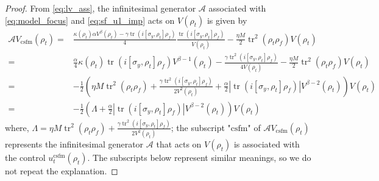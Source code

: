 \documentclass[]{elsarticle}
\begin{document}
\begin{proof}
	From \eqref{eq:lv_ass}, the infinitesimal generator $\mathcal{A}$ associated with \eqref{eq:model_focus} and \eqref{eq:sf_u1_imp} acts on $V\left(\rho_{t}\right)$ is given by
	\begin{equation}\label{eq:LV_sf_imp}
		\begin{aligned}
			\mathcal{A}V_{\mathrm{csfm}}\left(\rho_{t}\right)=&\frac{\kappa\left(\rho_{t}\right)\alpha V^{\beta}\left(\rho_{t}\right)-\gamma \operatorname{tr}\left(i\left[\sigma_{y}, \rho_{t}\right] \rho_f\right)}{4} \frac{\operatorname{tr}\left(i\left[\sigma_{y}, \rho_{t}\right] {\rho_f}\right)}{V\left(\rho_{t}\right)}-\frac{\eta M}{2}\operatorname{tr}^2\left(\rho_{t} {\rho_f}\right) V\left(\rho_{t}\right)\\
			=&\frac{\alpha}{4}\kappa\left(\rho_{t}\right)\operatorname{tr}\left(i\left[\sigma_{y}, \rho_{t}\right] {\rho_f}\right)V^{\beta-1}\left(\rho_{t}\right)
			-\frac{\gamma\operatorname{tr}^2\left(i\left[\sigma_{y}, \rho_{t}\right] {\rho_f}\right)}{4V\left(\rho_{t}\right)}
			-\frac{\eta M}{2}\operatorname{tr}^{2}\left(\rho_{t} {\rho_f}\right) V\left(\rho_{t}\right)\\
			=&-\frac{1}{2}\left({\eta M}\operatorname{tr}^{2}\left(\rho_{t} {\rho_f}\right)+\frac{\gamma\operatorname{tr}^2\left(i\left[\sigma_{y}, \rho_{t}\right] {\rho_f}\right)}{2V^2\left(\rho_{t}\right)}+\frac{\alpha}{2}|\operatorname{tr}\left(i\left[\sigma_{y}, \rho_{t}\right] {\rho_f}\right)| V^{\beta-2}\left(\rho_{t}\right)\right)V\left(\rho_{t}\right)\\
			=&-\frac{1}{2}\left(\Lambda+\frac{\alpha}{2}|\operatorname{tr}\left(i\left[\sigma_{y}, \rho_{t}\right] {\rho_f}\right)| V^{\beta-2}\left(\rho_{t}\right)\right)V\left(\rho_{t}\right)
		\end{aligned}
	\end{equation}
	where, $\Lambda={\eta M}\operatorname{tr}^{2}\left(\rho_{t} {\rho_f}\right)+\frac{\gamma\operatorname{tr}^2\left(i\left[\sigma_{y}, \rho_{t}\right] {\rho_f}\right)}{2V^2\left(\rho_{t}\right)}$; the subscript "$\mathrm{csfm}$" of $\mathcal{A} V_{\mathrm{csfm}}\left(\rho_{t}\right)$ represents the infinitesimal generator $\mathcal{A}$ that acts on $V\left(\rho_{t}\right)$ is associated with the control $	u_t^{\mathrm{csfm}}\left(\rho_{t}\right)$. The subscripts below represent similar meanings, so we do not repeat the explanation. 
	

\end{proof}
\end{document}

